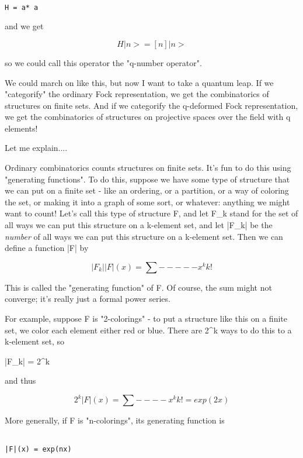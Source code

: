 \begin{verbatim}

H = a* a
\end{verbatim}
    
and we get


$$

H|n> = [n] |n>
$$
    
so we could call this operator the "q-number operator".  

We could march on like this, but now I want to take a quantum leap.   
If we "categorify" the ordinary Fock representation, we get the
combinatorics of structures on finite sets.  And if we categorify the
q-deformed Fock representation, we get the combinatorics of structures
on projective spaces over the field with q elements!

Let me explain....

Ordinary combinatorics counts structures on finite sets.  It's fun to do
this using "generating functions".  To do this, suppose we have some
type of structure that we can put on a finite set - like an ordering, or
a partition, or a way of coloring the set, or making it into a graph of
some sort, or whatever: anything we might want to count!  Let's call
this type of structure F, and let F_{k} stand for the set of all ways we
can put this structure on a k-element set, and let |F_{k}| 
be the \emph{number}
of all ways we can put this structure on a k-element set.  Then we can
define a function |F| by


$$

               |F_{k}| 
|F|(x) =   \sum  -----  x^{k}
                k!
$$
    
This is called the "generating function" of F.  Of course, the sum
might not converge; it's really just a formal power series.

For example, suppose F is "2-colorings" - to put a structure
like this on a finite set, we color each element either red or blue.
There are 2^{k} ways to do this to a k-element set, so

|F_{k}| = 2^{k}

and thus

$$

              2^{k} 
|F|(x) =  \sum  ----  x^{k}
              k!

       = exp(2x)
$$
    
More generally, if F is "n-colorings", its generating function is


\begin{verbatim}

|F|(x) = exp(nx)
\end{verbatim}
    
